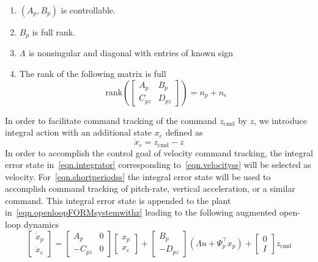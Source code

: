 \documentclass[]{../sty/aiaa-tc}
\theoremstyle{examplestyle}
\newenvironment{customthm}[1]
  {\renewcommand\theinnercustomthm{#1}\innercustomthm\normalfont}
  {\endinnercustomthm}
\begin{document}
  \begin{customthm}{1} $\;$\label{ass.plant}
    \begin{enumerate}[\Alph{enumi}), ref=\Alph{enumi}] %
      \itemsep0em
      \item{$(A_{p}^{},B_{p}^{})$ is controllable.\label{ass.p.cont}}
      \item{$B_{p}^{}$ is full rank.\label{ass.p.rank}}
      \item{$\Lambda^{}$ is nonsingular and diagonal with entries of known sign\label{ass.p.unc}}
      \item{The rank of the following matrix is full\label{ass.p.tzero}}
      \begin{equation*}
        \text{rank}\left(
        \begin{bmatrix}
          A_{p}^{} & B_{p}^{} \\
          C_{pz}^{} & D_{pz}^{}
        \end{bmatrix}\right)
        =n_{p} + n_{e}
      \end{equation*}
    \end{enumerate}
  \end{customthm}
  In order to facilitate command tracking of the command $z_{\text{cmd}}$ by $z$, we introduce integral action with an additional state $x_{e}$ defined as
  \begin{equation}
    \label{eqn.integrator}
    \dot{x}_{e} = z_{\text{cmd}} - z
  \end{equation}
  In order to accomplish the control goal of velocity command tracking, the integral error state in\ \eqref{eqn.integrator} corresponding to\ \eqref{eqn.velocityss} will be selected as velocity.
  For\ \eqref{eqn.shortperiodss} the integral error state will be used to accomplish command tracking of pitch-rate, vertical acceleration, or a similar command.
  This integral error state is appended to the plant in\ \eqref{eqn.openloopFORMsystemwithz} leading to the following augmented open-loop dynamics
  \begin{equation}
    \label{eqn.augmented}
    \begin{bmatrix}
      \dot{x}_{p} \\
      \dot{x}_{e}
    \end{bmatrix}
    =
    \begin{bmatrix}
      A_{p} & 0 \\
      -C_{pz} & 0
    \end{bmatrix}
    \begin{bmatrix}
      x_{p} \\
      x_{e}
    \end{bmatrix}
    +
    \begin{bmatrix}
      B_{p} \\
      -D_{pz}
    \end{bmatrix}
    (\Lambda u + \Psi_{p}^{\top}x_{p})
    +
    \begin{bmatrix}
      0 \\
      I
    \end{bmatrix}
    z_{\text{cmd}}
  \end{equation}
\end{document}
